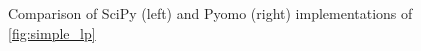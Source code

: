 \begin{figure}[H]
    \caption{Comparison of SciPy (left) and Pyomo (right) implementations of \cref{fig:simple_lp}}
    \label{fig:compare_lp}
\end{figure}
